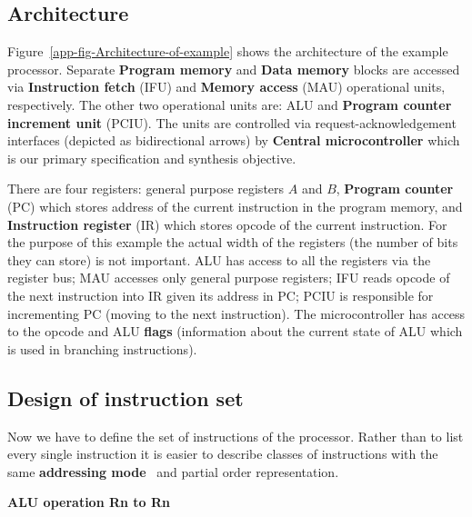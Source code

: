 \subsection{Architecture}

Figure~\ref{app-fig-Architecture-of-example} shows the architecture
of the example processor. Separate \textbf{Program memory} and \textbf{Data
memory} blocks are accessed via \textbf{Instruction fetch} (IFU) and
\textbf{Memory access} (MAU) operational units, respectively. The
other two operational units are: ALU and \textbf{Program counter increment
unit} (PCIU). The units are controlled via request-acknowledgement
interfaces (depicted as bidirectional arrows) by \textbf{Central microcontroller}
which is our primary specification and synthesis objective. 

There are four registers: general purpose registers $A$ and $B$,
\textbf{Program counter} (PC) which stores address of the current
instruction in the program memory, and \textbf{Instruction register}
(IR) which stores opcode of the current instruction. For the purpose
of this example the actual width of the registers (the number of bits
they can store) is not important. ALU has access to all the registers
via the register bus; MAU accesses only general purpose registers;
IFU reads opcode of the next instruction into IR given its address
in PC; PCIU is responsible for incrementing PC (moving to the next
instruction). The microcontroller has access to the opcode and ALU
\textbf{flags} (information about the current state of ALU which is
used in branching instructions).


\subsection{Design of instruction set\label{app-sub-Design-of-instruction}}

Now we have to define the set of instructions of the processor. Rather
than to list every single instruction it is easier to describe classes
of instructions with the same \textbf{addressing mode}~\cite{mspmanual}
and partial order representation.

\textbf{ALU operation Rn to Rn}

